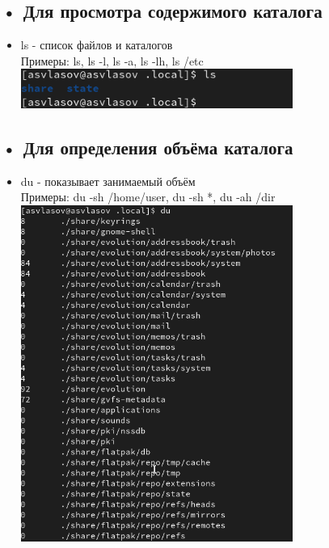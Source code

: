 \documentclass[
  12pt,
  a4paper,
  DIV=11,
  numbers=noendperiod]{scrreprt}
\providecommand{\tightlist}{%
  \setlength{\itemsep}{0pt}\setlength{\parskip}{0pt}}\usepackage{longtable,booktabs,array}
\begin{document}
\subsection{• Для просмотра содержимого
каталога}\label{ux434ux43bux44f-ux43fux440ux43eux441ux43cux43eux442ux440ux430-ux441ux43eux434ux435ux440ux436ux438ux43cux43eux433ux43e-ux43aux430ux442ux430ux43bux43eux433ux430}

\begin{itemize}
\tightlist
\item
  ls - список файлов и каталогов\\
  Примеры: ls, ls -l, ls -a, ls -lh, ls /etc
  \includegraphics[width=0.7\textwidth,height=\textheight]{image/20.png}
\end{itemize}

\subsection{• Для определения объёма
каталога}\label{ux434ux43bux44f-ux43eux43fux440ux435ux434ux435ux43bux435ux43dux438ux44f-ux43eux431ux44aux451ux43cux430-ux43aux430ux442ux430ux43bux43eux433ux430}

\begin{itemize}
\tightlist
\item
  du - показывает занимаемый объём\\
  Примеры: du -sh /home/user, du -sh *, du -ah /dir
  \includegraphics[width=0.7\textwidth,height=\textheight]{image/21.png}
\end{itemize}
\end{document}
